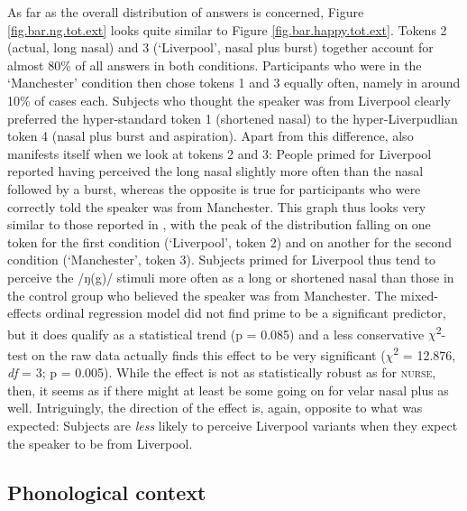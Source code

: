 As far as the overall distribution of answers is concerned, Figure \ref{fig.bar.ng.tot.ext} looks quite similar to Figure \ref{fig.bar.happy.tot.ext}.
Tokens 2 (actual, long nasal) and 3 (`Liverpool', nasal plus burst) together account for almost 80\% of all answers in both conditions.
Participants who were in the `Manchester' condition then chose tokens 1 and 3 equally often, namely in around 10\% of cases each.
Subjects who thought the speaker was from Liverpool clearly preferred the hyper-standard token 1 (shortened nasal) to the hyper-Liverpudlian token 4 (nasal plus burst and aspiration).
Apart from this difference,  also manifests itself when we look at tokens 2 and 3: People primed for Liverpool reported having perceived the long nasal slightly more often than the nasal followed by a burst, whereas the opposite is true for participants who were correctly told the speaker was from Manchester.
This graph thus looks very similar to those reported in \textcite{hayetal2006a, haydrager2010}, with the peak of the distribution falling on one token for the first condition (`Liverpool', token 2) and on another for the second condition (`Manchester', token 3).
Subjects primed for Liverpool thus tend to perceive the /ŋ(g)/ stimuli more often as a long or shortened nasal than those in the control group who believed the speaker was from Manchester.
The mixed-effects ordinal regression model did not find prime to be a significant predictor, but it does qualify as a statistical trend (p = 0.085) and a less conservative \(\chi\)\textsuperscript{2}-test on the raw data actually finds this effect to be very significant (\(\chi\)\textsuperscript{2} = 12.876, \emph{df} = 3; p = 0.005).
While the effect is not as statistically robust as for \textsc{nurse}, then, it seems as if there might at least be some  going on for velar nasal plus as well.
Intriguingly, the direction of the effect is, again, opposite to what was expected: Subjects are \emph{less} likely to perceive Liverpool variants when they expect the speaker to be from Liverpool.

\subsection{Phonological context}
\label{sec.perc_res.ng.phon}

